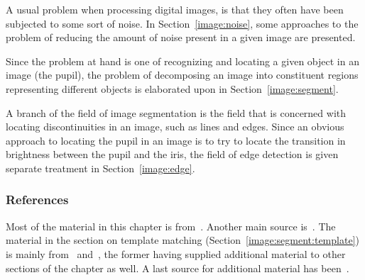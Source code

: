 A usual problem when processing digital images, is that they often
have been subjected to some sort of noise.  In
Section~\ref{image:noise}, some approaches to the problem of reducing
the amount of noise present in a given image are presented.  

Since the problem at hand is one of recognizing and locating a given
object in an image (the pupil), the problem of decomposing an image
into constituent regions representing different objects is elaborated
upon in Section~\ref{image:segment}.  

A branch of the field of image segmentation is the field that is
concerned with locating discontinuities in an image, such as lines and
edges.  Since an obvious approach to locating the pupil in an image is
to try to locate the transition in brightness between the pupil and
the iris, the field of edge detection is given separate treatment in
Section~\ref{image:edge}.

\subsubsection{References}

Most of the material in this chapter is from~\cite{digim}.  Another
main source is~\cite{digpic}.  The material in the section on template
matching (Section~\ref{image:segment:template}) is mainly
from~\cite{digpat} and~\cite{template}, the former having supplied
additional material to other sections of the chapter as well.  A last
source for additional material has been~\cite{digbild}.
